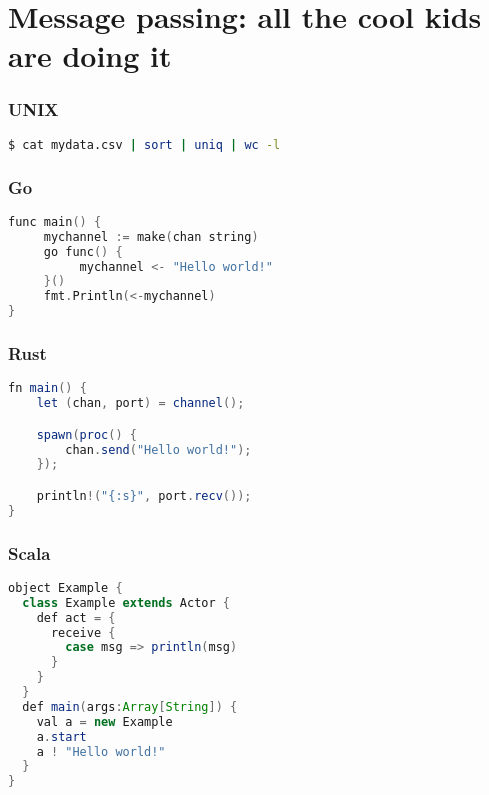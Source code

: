 \documentclass[compress]{beamer}
\begin{document}


\section{Message passing: all the cool kids are doing it}

\begin{frame}[fragile]
    \frametitle{UNIX}
    \begin{lstlisting}[language=sh]
$ cat mydata.csv | sort | uniq | wc -l
    \end{lstlisting}
\end{frame}

\begin{frame}[fragile]
    \frametitle{Go}
    \begin{lstlisting}[language=C,morekeywords={func,make,go}]
func main() {
     mychannel := make(chan string)
     go func() {
          mychannel <- "Hello world!"
     }()
     fmt.Println(<-mychannel)
}
    \end{lstlisting}
\end{frame}

\begin{frame}[fragile]
    \frametitle{Rust}
    \begin{lstlisting}[language=Java,morekeywords={fn,let,spawn}]
fn main() {
    let (chan, port) = channel();

    spawn(proc() {
        chan.send("Hello world!");
    });

    println!("{:s}", port.recv());
}
    \end{lstlisting}
\end{frame}

\begin{frame}[fragile]
    \frametitle{Scala}
    \begin{lstlisting}[language=Java,morekeywords={val,def,receive}]
object Example {
  class Example extends Actor {
    def act = {
      receive {
        case msg => println(msg)
      }
    }
  }
  def main(args:Array[String]) {
    val a = new Example 
    a.start
    a ! "Hello world!"
  }
}
    \end{lstlisting}
\end{frame}
\end{document}
